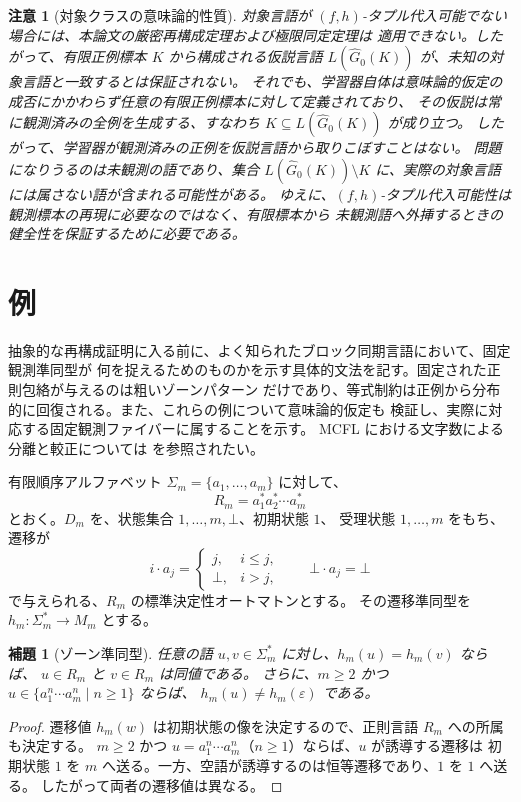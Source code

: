 \documentclass[11pt,a4paper]{ltjsarticle}
\newtheorem{lemma}[theorem]{補題}
\newtheorem{remark}[theorem]{注意}
\theoremstyle{remark}
\newcommand{\eps}{\varepsilon}
\begin{document}
\begin{remark}[対象クラスの意味論的性質]
対象言語が \((f,h)\)-タプル代入可能でない場合には、本論文の厳密再構成定理および極限同定定理は
適用できない。したがって、有限正例標本 \(K\) から構成される仮説言語
\(L(\widehat G_0(K))\) が、未知の対象言語と一致するとは保証されない。
それでも、学習器自体は意味論的仮定の成否にかかわらず任意の有限正例標本に対して定義されており、
その仮説は常に観測済みの全例を生成する、すなわち
\(K\subseteq L(\widehat G_0(K))\) が成り立つ。
したがって、学習器が観測済みの正例を仮説言語から取りこぼすことはない。
問題になりうるのは未観測の語であり、集合
\(L(\widehat G_0(K))\setminus K\) に、実際の対象言語には属さない語が含まれる可能性がある。
ゆえに、\((f,h)\)-タプル代入可能性は観測標本の再現に必要なのではなく、有限標本から
未観測語へ外挿するときの健全性を保証するために必要である。
\end{remark}


\section{例}
\label{sec:running-examples}

抽象的な再構成証明に入る前に、よく知られたブロック同期言語において、固定観測準同型が
何を捉えるためのものかを示す具体的文法を記す。固定された正則包絡が与えるのは粗いゾーンパターン
だけであり、等式制約は正例から分布的に回復される。また、これらの例について意味論的仮定も
検証し、実際に対応する固定観測ファイバーに属することを示す。
MCFL における文字数による分離と較正については \cite{LehnerLindorfer2020} を参照されたい。

有限順序アルファベット \(\Sigma_m=\{a_1,\ldots,a_m\}\) に対して、
\[
  R_m=a_1^*a_2^*\cdots a_m^*
\]
とおく。\(D_m\) を、状態集合 \(1,\ldots,m,\bot\)、初期状態 \(1\)、
受理状態 \(1,\ldots,m\) をもち、遷移が
\[
  i\cdot a_j=
  \begin{cases}
    j, & i\le j,\\
    \bot, & i>j,
  \end{cases}
  \qquad
  \bot\cdot a_j=\bot
\]
で与えられる、\(R_m\) の標準決定性オートマトンとする。
その遷移準同型を \(h_m:\Sigma_m^*\to M_m\) とする。

\begin{lemma}[ゾーン準同型]
\label{lem:zone-morphism-basic}
任意の語 \(u,v\in\Sigma_m^*\) に対し、\(h_m(u)=h_m(v)\) ならば、
\(u\in R_m\) と \(v\in R_m\) は同値である。
さらに、\(m\ge2\) かつ
\(u\in\{a_1^n\cdots a_m^n\mid n\ge1\}\) ならば、
\(h_m(u)\ne h_m(\eps)\) である。
\end{lemma}

\begin{proof}
遷移値 \(h_m(w)\) は初期状態の像を決定するので、正則言語 \(R_m\) への所属も決定する。
\(m\ge2\) かつ \(u=a_1^n\cdots a_m^n\)（\(n\ge1\)）ならば、\(u\) が誘導する遷移は
初期状態 \(1\) を \(m\) へ送る。一方、空語が誘導するのは恒等遷移であり、\(1\) を \(1\) へ送る。
したがって両者の遷移値は異なる。
\end{proof}
\end{document}
